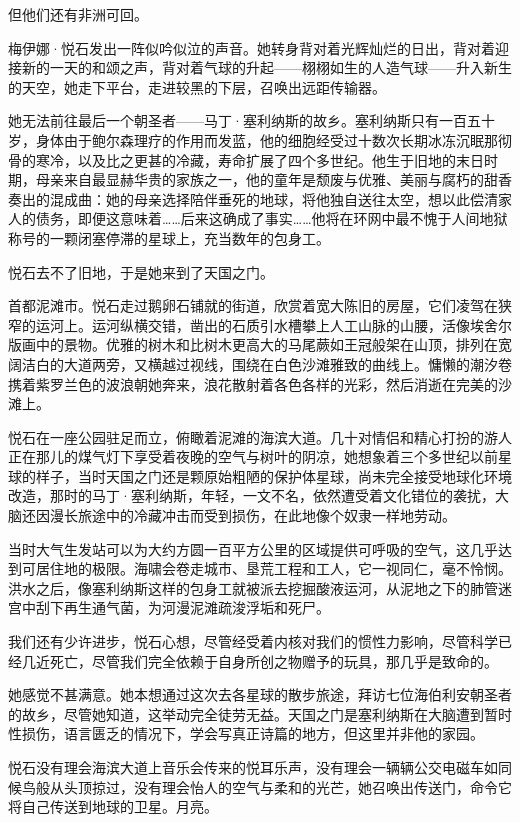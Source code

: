 \documentclass[AutoFakeBold=true]{book}
\begin{document}
{\kaishu 但他们还有非洲可回。}

梅伊娜·悦石发出一阵似吟似泣的声音。她转身背对着光辉灿烂的日出，背对着迎接新的一天的和颂之声，背对着气球的升起——栩栩如生的人造气球——升入新生的天空，她走下平台，走进较黑的下层，召唤出远距传输器。

\vspace*{1em}

她无法前往最后一个朝圣者——马丁·塞利纳斯的故乡。塞利纳斯只有一百五十岁，身体由于鲍尔森理疗的作用而发蓝，他的细胞经受过十数次长期冰冻沉眠那彻骨的寒冷，以及比之更甚的冷藏，寿命扩展了四个多世纪。他生于旧地的末日时期，母亲来自最显赫华贵的家族之一，他的童年是颓废与优雅、美丽与腐朽的甜香奏出的混成曲：她的母亲选择陪伴垂死的地球，将他独自送往太空，想以此偿清家人的债务，即便这意味着……后来这确成了事实……他将在环网中最不愧于人间地狱称号的一颗闭塞停滞的星球上，充当数年的包身工。

悦石去不了旧地，于是她来到了天国之门。

首都泥滩市。悦石走过鹅卵石铺就的街道，欣赏着宽大陈旧的房屋，它们凌驾在狭窄的运河上。运河纵横交错，凿出的石质引水槽攀上人工山脉的山腰，活像埃舍尔版画中的景物。优雅的树木和比树木更高大的马尾蕨如王冠般架在山顶，排列在宽阔洁白的大道两旁，又横越过视线，围绕在白色沙滩雅致的曲线上。慵懒的潮汐卷携着紫罗兰色的波浪朝她奔来，浪花散射着各色各样的光彩，然后消逝在完美的沙滩上。

悦石在一座公园驻足而立，俯瞰着泥滩的海滨大道。几十对情侣和精心打扮的游人正在那儿的煤气灯下享受着夜晚的空气与树叶的阴凉，她想象着三个多世纪以前星球的样子，当时天国之门还是颗原始粗陋的保护体星球，尚未完全接受地球化环境改造，那时的马丁·塞利纳斯，年轻，一文不名，依然遭受着文化错位的袭扰，大脑还因漫长旅途中的冷藏冲击而受到损伤，在此地像个奴隶一样地劳动。

当时大气生发站可以为大约方圆一百平方公里的区域提供可呼吸的空气，这几乎达到可居住地的极限。海啸会卷走城市、垦荒工程和工人，它一视同仁，毫不怜悯。洪水之后，像塞利纳斯这样的包身工就被派去挖掘酸液运河，从泥地之下的肺管迷宫中刮下再生通气菌，为河漫泥滩疏浚浮垢和死尸。

{\kaishu 我们还有少许进步，}悦石心想，{\kaishu 尽管经受着内核对我们的惯性力影响，尽管科学已经几近死亡，尽管我们完全依赖于自身所创之物赠予的玩具，那几乎是致命的。}

她感觉不甚满意。她本想通过这次去各星球的散步旅途，拜访七位海伯利安朝圣者的故乡，尽管她知道，这举动完全徒劳无益。天国之门是塞利纳斯在大脑遭到暂时性损伤，语言匮乏的情况下，学会写真正诗篇的地方，但这里并非他的家园。

悦石没有理会海滨大道上音乐会传来的悦耳乐声，没有理会一辆辆公交电磁车如同候鸟般从头顶掠过，没有理会怡人的空气与柔和的光芒，她召唤出传送门，命令它将自己传送到地球的卫星。{\kaishu 月亮。}
\end{document}
